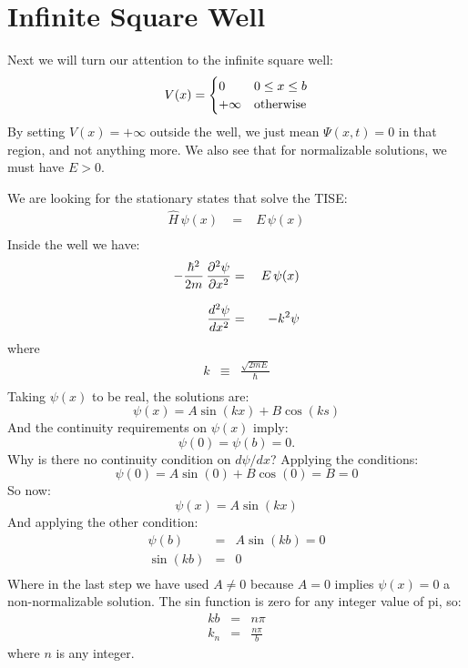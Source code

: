 \documentclass[12pt]{book}
\begin{document}
\section{Infinite Square Well}

Next we will turn our attention to the infinite square well:
\begin{equation}
V(x) = 
\begin{cases}    
   0 & 0 \leq x \leq b \\
   +\infty & {\rm otherwise} \\
\end{cases}   
\end{equation}
By setting $V(x) = +\infty$ outside the well, we just mean $\Psi(x,t)=0$ in that region, and not anything more.  We also see that for normalizable solutions, we must have $E>0$.  

We are looking for the stationary states that solve the TISE:
\begin{eqnarray*}
\hat{H} \, \psi(x) \; &=& \; E \, \psi(x) \\
\end{eqnarray*}
Inside the well we have:
\begin{eqnarray*}
-\frac{\hbar^2}{2m}\,\frac{\partial^2\psi}{\partial x^2} &=& \; E \, \psi(x) \\[8pt]
 \frac{d^2 \psi}{dx^2}  &=& -k^2 \psi \\
\end{eqnarray*}
where
\begin{eqnarray*}
k &\equiv& \frac{\sqrt{2mE}}{\hbar} \\
\end{eqnarray*}
Taking $\psi(x)$ to be real, the solutions are:
\begin{equation*}
\psi(x) = A \sin(kx) + B \cos(ks)
\end{equation*}
And the continuity requirements on $\psi(x)$ imply:
\begin{equation*}
\psi(0) = \psi(b) = 0.
\end{equation*}
Why is there no continuity condition on $d\psi/dx$?  Applying the conditions:
\begin{equation*}
\psi(0) = A \sin(0) + B \cos(0) = B = 0
\end{equation*}
So now:
\begin{equation*}
\psi(x) = A \sin(kx) 
\end{equation*}
And applying the other condition:
\begin{eqnarray*}
\psi(b)  &=& A \sin(kb) = 0 \\
\sin(kb) &=& 0 \\
\end{eqnarray*}
Where in the last step we have used $A \neq 0$ because $A=0$ implies $\psi(x)=0$ a non-normalizable solution.  The sin function is zero for any integer value of pi, so:
\begin{eqnarray*}
kb &=& n \pi \\[12pt]
k_n&=&\frac{n\pi}{b}
\end{eqnarray*}
where $n$ is any integer.  
\end{document}
